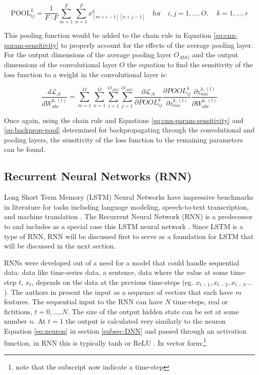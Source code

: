 \begin{equation}
    \text{POOL}_{ij}^k = \frac{1}{F \cdot F} \sum_{m=1}^{F} \sum_{n=1}^{F} x_{[m+i-1][n+j-1]}^k \quad \text{for} \quad i,j = 1,...,O, \quad k = 1,...,r
\end{equation}

This pooling function would be added to the chain rule in Equation \ref{eq:cnn-param-sensitivity} to properly account for the effects of the average pooling layer. For the output dimensions of the average pooling layer $O_{AVG}$ and the output dimensions of the convolutional layer $O$ the equation to find the sensitivity of the loss function to a weight in the convolutional layer is:

\begin{equation}
    \frac{d\mathcal{L}_\mathcal{A}}{dW_{abc}^{k, (l)}} = \sum_{m=1}^{O} \sum_{n=1}^{O} \sum_{i=1}^{O_{AVG}} \sum_{j=1}^{O_{AVG}} \frac{\partial \mathcal{L}_\mathcal{A}}{\partial POOL_{ij}^k} \frac{\partial POOL_{ij}^k}{\partial z_{mn}^{k, (l)}} \frac{\partial z_{mn}^{k, (l)}}{\partial W_{abc}^{k, (l)}}
\end{equation}

Once again, using the chain rule and Equations \ref{eq:cnn-param-sensitivity} and \ref{eq:backprop-pool} determined for backpropagating through the convolutional and pooling layers, the sensitivity of the loss function to the remaining parameters can be found.

\subsection{Recurrent Neural Networks (RNN)}
Long Short Term Memory (LSTM) Neural Networks have impressive benchmarks in literature for tasks including language modeling, speech-to-text transcription, and machine translation \cite{sherstinskyFundamentalsRecurrentNeural2020a}. The Recurrent Neural Network (RNN) is a predecessor to and includes as a special case this LSTM neural network \cite{sherstinskyFundamentalsRecurrentNeural2020a}. Since LSTM is a type of RNN, RNN will be discussed first to serve as a foundation for LSTM that will be discussed in the next section.

RNNs were developed out of a need for a model that could handle sequential data: data like time-series data, a sentence, data where the value at some time-step $t$, $x_t$, depends on the data at the previous time-steps (eg. $x_{t-1}, x_{t-2}, x_{t-3}...$). The authors in \cite{salemRecurrentNeuralNetworks2022} present the input as a sequence of vectors that each have $m$ features. The sequential input to the RNN can have $N$ time-steps, real or fictitious, $t=0,...,N$. The size of the output hidden state can be set at some number $n$. At $t=1$ the output is calculated very similarly to the neuron Equation \ref{eq:neuron} in section \ref{subsec:DNN} and passed through an activation function, in RNN this is typically tanh or ReLU \cite{salemRecurrentNeuralNetworks2022}. In vector form:\footnote{note that the subscript now indicate a time-step}

